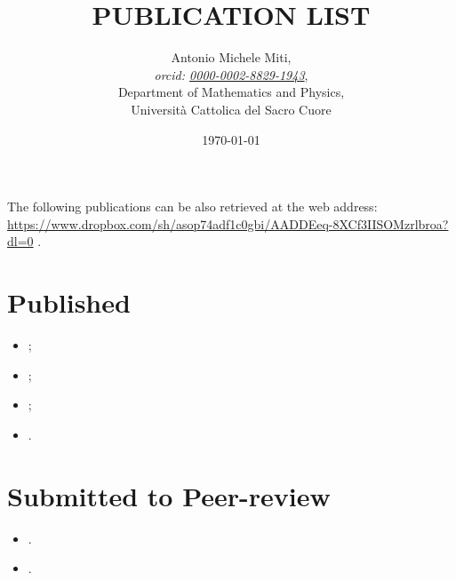 \documentclass{article}
\title{PUBLICATION LIST}
\date{\today}
\author{
	Antonio Michele Miti,\\
	\emph{orcid: \href{https://orcid.org/0000-0002-8829-1943}{0000-0002-8829-1943}},
	\\
	Department of Mathematics and Physics,\\
	Università Cattolica del Sacro Cuore
}
\begin{document}
  

	\maketitle

	\noindent
  The following publications can be also retrieved at the web address:
  \\ 
  \url{https://www.dropbox.com/sh/asop74adf1c0gbi/AADDEeq-8XCf3IISOMzrlbroa?dl=0}
  .


  \section*{Published}
	  \begin{itemize}
 	   \item {};
 	   \item {};
 	   \item {};
 	   \item {}.
	  \end{itemize}



  \section*{Submitted to Peer-review}
	  \begin{itemize}
    	   \item {}.
 	 	  \item {}.
	  \end{itemize}

%  

  
\end{document}
